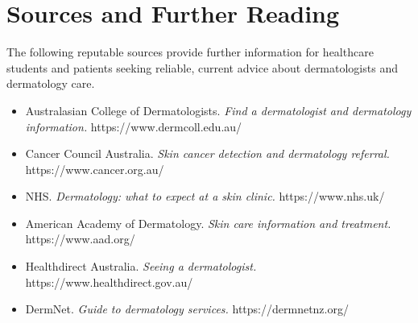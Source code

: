 \section*{Sources and Further Reading}
The following reputable sources provide further information for healthcare students and patients seeking reliable, current advice about dermatologists and dermatology care.

\begin{itemize}
    \item Australasian College of Dermatologists. \textit{Find a dermatologist and dermatology information.} https://www.dermcoll.edu.au/
    \item Cancer Council Australia. \textit{Skin cancer detection and dermatology referral.} https://www.cancer.org.au/
    \item NHS. \textit{Dermatology: what to expect at a skin clinic.} https://www.nhs.uk/
    \item American Academy of Dermatology. \textit{Skin care information and treatment.} https://www.aad.org/
    \item Healthdirect Australia. \textit{Seeing a dermatologist.} https://www.healthdirect.gov.au/
    \item DermNet. \textit{Guide to dermatology services.} https://dermnetnz.org/
\end{itemize}
